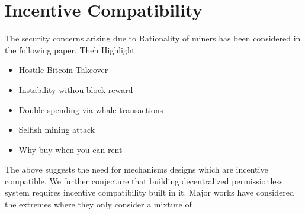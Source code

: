 \section{Incentive Compatibility}
The security concerns arising due to Rationality of miners has been considered in the following paper. Theh Highlight
\begin{itemize}
    \item Hostile Bitcoin Takeover \cite{bonneau2018hostile}
    \item Instability withou block reward \cite{carlsten2016instability}
    \item Double spending via whale transactions \cite{liao2017incentivizing}
    \item Selfish mining attack \cite{eyal2016bitcoin}
    \item Why buy when you can rent \cite{bonneau2016buy}
\end{itemize}

The above suggests the need for mechanisms designs which are incentive compatible. We further conjecture that building decentralized permissionless system requires incentive compatibility built in it. Major works have considered the extremes where they only consider a mixture of 